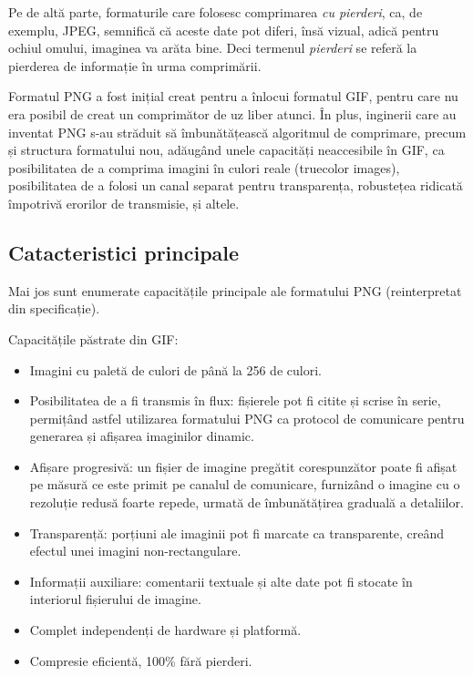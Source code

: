 \documentclass[a4paper,12pt]{report}
\begin{document}
Pe de altă parte, formaturile care folosesc comprimarea \textit{cu pierderi},
ca, de exemplu, \ac{JPEG}, semnifică că aceste date pot diferi,
însă vizual, adică pentru ochiul omului, imaginea va arăta bine.
Deci termenul \textit{pierderi} se referă la pierderea de informație în urma comprimării.

Formatul \ac{PNG} a fost inițial creat pentru a înlocui formatul \ac{GIF},
pentru care nu era posibil de creat un comprimător de uz liber atunci\cite{gif_unusable_reason}.
În plus, inginerii care au inventat \ac{PNG} s-au străduit să îmbunătățească algoritmul de comprimare,
precum și structura formatului nou, adăugând unele capacități neaccesibile în \ac{GIF},
ca posibilitatea de a comprima imagini în culori reale (truecolor images),
posibilitatea de a folosi un canal separat pentru transparența,
robustețea ridicată împotrivă erorilor de transmisie, și altele.

\subsection{Catacteristici principale}

Mai jos sunt enumerate capacitățile principale ale formatului \ac{PNG} (reinterpretat din specificație).

Capacitățile păstrate din GIF:

\begin{itemize}
    \item
        Imagini cu paletă de culori de până la 256 de culori.
        
    \item
        Posibilitatea de a fi transmis în flux:
        fișierele pot fi citite și scrise în serie, permițând astfel utilizarea formatului
        PNG ca protocol de comunicare pentru generarea și afișarea imaginilor dinamic.

    \item
        Afișare progresivă: un fișier de imagine pregătit corespunzător poate fi
        afișat pe măsură ce este primit pe canalul de comunicare,
        furnizând o imagine cu o rezoluție redusă foarte repede,
        urmată de îmbunătățirea graduală a detaliilor.

    \item
        Transparență: porțiuni ale imaginii pot fi marcate ca transparente,
        creând efectul unei imagini non-rectangulare.

    \item 
        Informații auxiliare: comentarii textuale și alte date pot fi
        stocate în interiorul fișierului de imagine.

    \item
        Complet independenți de hardware și platformă.

    \item
        Compresie eficientă, 100\% fără pierderi.
\end{itemize}
\end{document}
